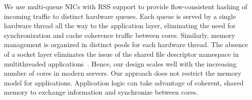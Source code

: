 




 We use
multi-queue NICs with RSS support to provide flow-consistent hashing
of incoming traffic to distinct hardware queues. Each queue is served
by a single hardware thread all the way to the application layer,
eliminating the need for synchronization and cache coherence traffic
between cores. Similarly, memory management is organized in distinct
pools for each hardware thread. The absence of a socket layer
eliminates the issue of the shared file descriptor namespace in
multithreaded
applications~\cite{DBLP:conf/sosp/ClementsKZMK13}. Hence, our design
scales well with the increasing number of cores in modern servers. Our
approach does not restrict the memory model for
applications. Application logic can take advantage of coherent, shared
memory to exchange information and synchronize between cores.




